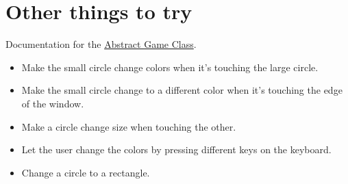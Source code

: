 \documentclass{tufte-handout}
\begin{document}
\section{Other things to try}

Documentation for the \href{https://tov.github.io/ge211/classge211_1_1_abstract__game.html}{Abstract Game Class}.

\begin{itemize}

  \item Make the small circle change colors when it's touching
    the large circle.

  \item Make the small circle change to a different color when it's
    touching the edge of the window.

  \item Make a circle change size when touching the other.

  \item Let the user change the colors by pressing different keys on the
    keyboard.

  \item Change a circle to a rectangle.


\end{itemize}
\end{document}
